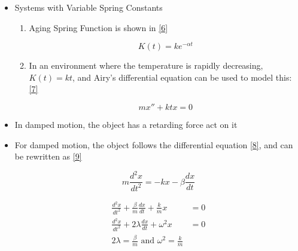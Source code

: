 \documentclass[12pt]{article}
\begin{document}
\begin{itemize}
\begin{enumerate}
\begin{enumerate}
    \end{enumerate}

\end{enumerate}

\item Systems with Variable Spring Constants

  \begin{enumerate}

    \item Aging Spring Function is shown in \eqref{6}

      \begin{equation}
        K(t)=ke^{-\alpha t}
        \label{6}
      \end{equation}

    \item In an environment where the temperature is rapidly decreasing, $K(t)=kt$, and Airy's differential equation can be used to model this: \eqref{7}

      \begin{equation}
        mx''+ktx=0
        \label{7}
      \end{equation}

  \end{enumerate}

\item In damped motion, the object has a retarding force act on it

\item For damped motion, the object follows the differential equation \eqref{8}, and can be rewritten as \eqref{9}

  \begin{equation}
    m\frac{d^2x}{dt^2}=-kx-\beta\frac{dx}{dt}
    \label{8}
  \end{equation}

  \begin{equation}
    \begin{split}
      \frac{d^2x}{dt^2}+\frac{\beta}{m}\frac{dx}{dt}+\frac{k}{m}x&=0\\
      \frac{d^2x}{dt^2}+2\lambda\frac{dx}{dt}+\omega^2x&=0\\
      2\lambda=\frac{\beta}{m} \text{ and } \omega^2=\frac{k}{m}
    \end{split}
    \label{9}
  \end{equation}

\end{itemize}
\end{document}
